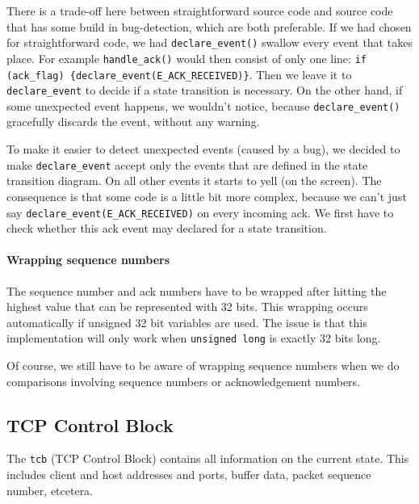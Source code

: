 \documentclass[11pt]{article}
\begin{document}
    There is a trade-off here between straightforward source code and source 
    code that has some build in bug-detection, which are both preferable. If we 
    had chosen for straightforward code, we had \lstinline|declare_event()| swallow
    every event that takes place. For example \lstinline|handle_ack()| would then 
    consist of only one line: 
    \lstinline|if (ack_flag) {declare_event(E_ACK_RECEIVED)}|. Then we leave it to 
    \lstinline|declare_event| to decide if a state transition is necessary.
    On the other hand, if
    some unexpected event happens, we wouldn't notice, because 
    \lstinline|declare_event()| gracefully discards the event, without any warning.
    
    To make it easier to detect unexpected events (caused by a bug), we decided 
    to make \lstinline|declare_event| accept only the events that are defined in the
    state transition diagram. On all other events it starts to yell (on the 
    screen). The consequence is that some code is a little bit more complex, 
    because we can't just say \lstinline|declare_event(E_ACK_RECEIVED)|
    on every incoming ack. We first have to check whether this ack event may 
    declared for a state transition.
    
    
\paragraph{Wrapping sequence numbers}
    The sequence number and ack numbers have to be wrapped after hitting the 
    highest value that can be represented with 32 bits. This wrapping occurs 
    automatically if unsigned 32 bit variables are used. The issue is that 
    this implementation will only work when \lstinline|unsigned long| is 
    exactly 32 bits long.
    
    Of course, we still have to be aware of wrapping sequence numbers when we do
    comparisons involving sequence numbers or acknowledgement numbers.



\subsection{TCP Control Block}


The \lstinline|tcb| (TCP Control Block) contains all information on the
current state. This includes client and host addresses and ports, buffer
data, packet sequence number, etcetera.


\paragraph{}
\end{document}
